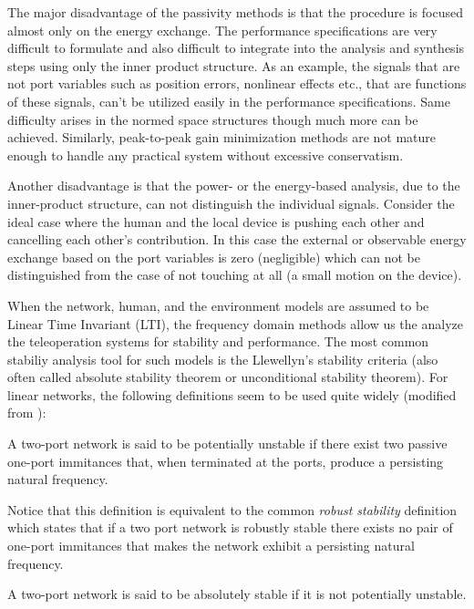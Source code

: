 The major disadvantage of the passivity methods is that the procedure is focused almost only on the 
energy exchange. The performance specifications are very difficult to formulate and also difficult 
to integrate into the analysis and synthesis steps using only the inner product structure. As an 
example, the signals that are not port variables such as position errors, nonlinear effects etc.,
that are functions of these signals, can't be utilized easily in the performance specifications. 
Same difficulty arises in the normed space structures though much more can be achieved. Similarly,
peak-to-peak gain minimization methods are not mature enough to handle any practical system without 
excessive conservatism. 


Another disadvantage is that the power- or the energy-based analysis, due to the inner-product structure, 
can not distinguish the individual signals. Consider the ideal case where the human and the local 
device is pushing each other and cancelling each other's contribution. In this case the external or observable 
energy exchange based on the port variables is zero (negligible) which can not be distinguished from the case of 
not touching at all (a small motion on the device). 


When the network, human, and the environment models are assumed to be Linear Time Invariant (LTI), the frequency domain methods
allow us the analyze the teleoperation systems for stability and performance. The most common stabiliy analysis tool for such 
models is the Llewellyn's stability criteria (also often called absolute stability theorem or unconditional stability theorem). 
For linear networks, the following definitions seem to be used quite widely (modified from \cite{chen91}): 

\begin{define} A two-port network is said to be potentially unstable if there exist two passive one-port 
immitances that, when terminated at the ports, produce a persisting natural frequency.
\end{define}

Notice that this definition is equivalent to the common \emph{robust stability} definition which states that if a two port 
network is robustly stable there exists no pair of one-port immitances that makes the network exhibit a persisting natural 
frequency. 

\begin{define} A two-port network is said to be absolutely stable if it is not potentially unstable.
\end{define}


